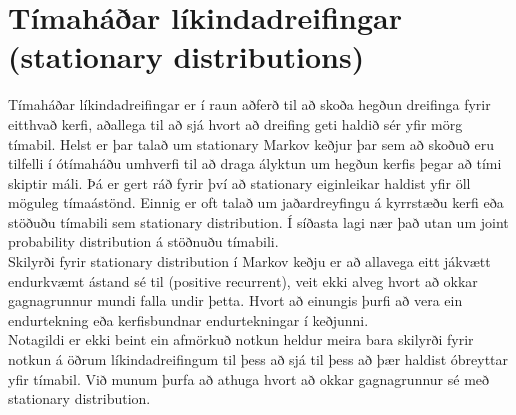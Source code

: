 \section {Tímaháðar líkindadreifingar (stationary distributions)}


Tímaháðar líkindadreifingar er í raun aðferð til að skoða hegðun dreifinga fyrir eitthvað kerfi, aðallega til að sjá hvort að dreifing geti haldið sér yfir mörg tímabil. Helst er þar talað um stationary Markov keðjur þar sem að skoðuð eru tilfelli í ótímaháðu umhverfi til að draga ályktun um hegðun kerfis þegar að tími skiptir máli. Þá er gert ráð fyrir því að stationary eiginleikar haldist yfir öll möguleg tímaástönd. Einnig er oft talað um jaðardreyfingu á kyrrstæðu kerfi eða stöðuðu tímabili sem stationary distribution. Í síðasta lagi nær það utan um joint probability distribution á stöðnuðu tímabili.\\

Skilyrði fyrir stationary distribution í Markov keðju er að allavega eitt jákvætt endurkvæmt ástand sé til (positive recurrent), veit ekki alveg hvort að okkar gagnagrunnur mundi falla undir þetta. Hvort að einungis þurfi að vera ein endurtekning eða kerfisbundnar endurtekningar í keðjunni.\\

Notagildi er ekki beint ein afmörkuð notkun heldur meira bara skilyrði fyrir notkun á öðrum líkindadreifingum til þess að sjá til þess að þær haldist óbreyttar yfir tímabil.  Við munum þurfa að athuga hvort að okkar gagnagrunnur sé með stationary distribution.
